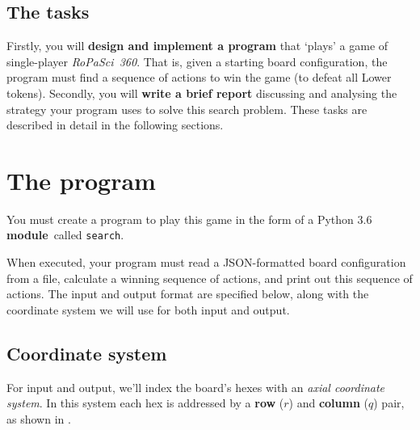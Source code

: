 \documentclass[]{article}
\begin{document}
\subsection*{The tasks}

Firstly, you will \textbf{design and implement a program} that `plays' a
game of single-player \emph{RoPaSci~360}.
That is, given a starting board configuration, the program must find a
sequence of actions to win the game (to defeat all Lower tokens).
Secondly, you will \textbf{write a brief report} discussing and analysing
the strategy your program uses to solve this search problem.
These tasks are described in detail in the following sections.


\section*{The program}

You must create a program to play this game in the form of a Python 3.6
\textbf{module}\footnotemark\ called \texttt{search}.


When executed, your program must read a JSON-formatted board
configuration from a file, calculate a winning sequence of actions, and
print out this sequence of actions.
%
The input and output format are specified below, along with the coordinate
system we will use for both input and output.


\subsection*{Coordinate system}

For input and output, we'll index the board's hexes with an
\emph{axial coordinate system}\footnotemark.
In this system each hex is addressed by a \textbf{row} ($r$) and
\textbf{column} ($q$) pair, as shown in .
\end{document}
